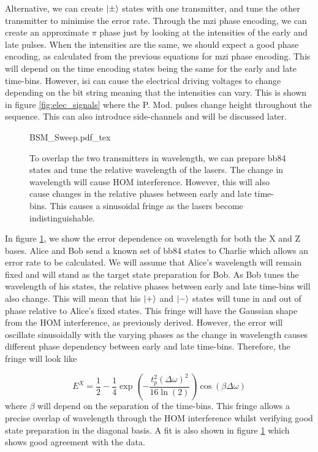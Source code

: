 Alternative, we can create $\ket{\pm}$ states with one transmitter, and tune the other transmitter to minimise the error rate. Through the \ac{mzi} phase encoding, we can create an approximate $\pi$ phase just by looking at the intensities of the early and late pulses. When the intensities are the same, we should expect a good phase encoding, as calculated from the previous equations for \ac{mzi} phase encoding. This will depend on the time encoding states being the same for the early and late time-bins. However, \ac{isi} can cause the electrical driving voltages to change depending on the bit string meaning that the intensities can vary. This is shown in figure \ref{fig:elec_signals} where the P. Mod. pulses change height throughout the sequence. This can also introduce side-channels and will be discussed later.

\begin{figure}[t]
	\centering
	\small
	\def\svgwidth{0.9\textwidth} 
	{BSM_Sweep.pdf_tex}
	\caption[Bell-state projection error against laser current]{To overlap the two transmitters in wavelength, we can prepare \acs{bb84} states and tune the relative wavelength of the lasers. The change in wavelength will cause \acs{HOM} interference. However, this will also cause changes in the relative phases between early and late time-bins. This causes a sinusoidal fringe as the lasers become indistinguishable.}
	\label{fig:wavelength_cal}
\end{figure}

In figure \ref{fig:wavelength_cal}, we show the error dependence on wavelength for both the X and Z bases. Alice and Bob send a known set of \ac{bb84} states to Charlie which allows an error rate to be calculated. We will assume that Alice's wavelength will remain fixed and will stand as the target state preparation for Bob. As Bob tunes the wavelength of his states, the relative phases between early and late time-bins will also change. This will mean that his $\ket{+}$ and $\ket{-}$ states will tune in and out of phase relative to Alice's fixed states. This fringe will have the Gaussian shape from the \ac{HOM} interference, as previously derived. However, the error will oscillate sinusoidally with the varying phases as the change in wavelength causes different phase dependency between early and late time-bins. Therefore, the fringe will look like

\begin{equation}
	E^X = \frac{1}{2} - \frac{1}{4} \exp\left(-\frac{t_p^2(\Delta\omega)^2}{16\ln(2)}\right) \cos(\beta\Delta\omega)
\end{equation}
where $\beta$ will depend on the separation of the time-bins. This fringe allows a precise overlap of wavelength through the \ac{HOM} interference whilst verifying good state preparation in the diagonal basis. A fit is also shown in figure \ref{fig:wavelength_cal} which shows good agreement with the data. 

